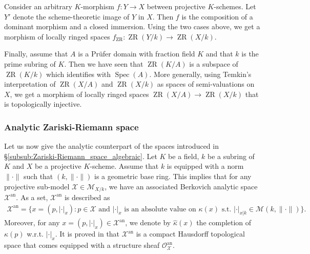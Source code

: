 \documentclass [11pt,reqno]{amsart}
\newcommand{\1}{\mathmybb{1}}
\def\cM{{\mathcal{M}}}
\def\cO{{\mathcal{O}}}
\def\cX{{\mathcal{X}}}
\def\an{\operatorname{an}}
\def\Spec{\operatorname{Spec}}
\def\ZR{\operatorname{ZR}}
\begin{document}
Consider an arbitrary $K$-morphism $f:Y\to X$ between projective $K$-schemes. Let $Y'$ denote the scheme-theoretic image of $Y$ in $X$. Then $f$ is the composition of a dominant morphism and a closed immersion. Using the two cases above, we get a morphism of locally ringed spaces $f_{\ZR}:\ZR(Y/k)\to\ZR(X/k)$.
 
Finally, assume that $A$ is a Prüfer domain with fraction field $K$ and that $k$ is the prime subring of $K$. Then we have seen that $\ZR(K/A)$ is a subspace of $\ZR(K/k)$ which identifies with $\Spec(A)$. More generally, using Temkin's interpretation of $\ZR(X/A)$ and $\ZR(X/k)$ as spaces of semi-valuations on $X$, we get a morphism of locally ringed spaces $\ZR(X/A)\to \ZR(X/k)$ that is topologically injective.

\subsubsection{Analytic Zariski-Riemann space}
\label{subsub:ZR_space_analytic}

Let us now give the analytic counterpart of the spaces introduced in \S \ref{subsub:Zariski-Riemann_space_algebraic}. Let $K$ be a field, $k$ be a subring of $K$ and $X$ be a projective $K$-scheme. Assume that $k$ is equipped with a norm $\|\cdot\|$ such that $(k,\|\cdot\|)$ is a geometric base ring. This implies that for any projective sub-model $\cX\in\cM_{X/k}$, we have an associated Berkovich analytic space $\cX^{\an}$. As a set, $\cX^{\an}$ is described as
\begin{align*}
\cX^{\an} = \{x=(p,|\cdot|_{x}) : p \in \cX \text{ and }|\cdot|_{x} \text{ is an absolute value on }\kappa(x) \text{ s.t. }|\cdot|_{x|k}\in \cM(k,\|\cdot\|)\}.
\end{align*}
Moreover, for any $x=(p,|\cdot|_{x})\in \cX^{\an}$, we denote by $\widehat{\kappa}(x)$ the completion of $\kappa(p)$ w.r.t. $|\cdot|_{x}$. It is proved in \cite{LemanissierPoineau24} that $\cX^{\an}$ is a compact Hausdorff topological space that comes equipped with a structure sheaf $\cO^{\an}_{\cX}$.
\end{document}
